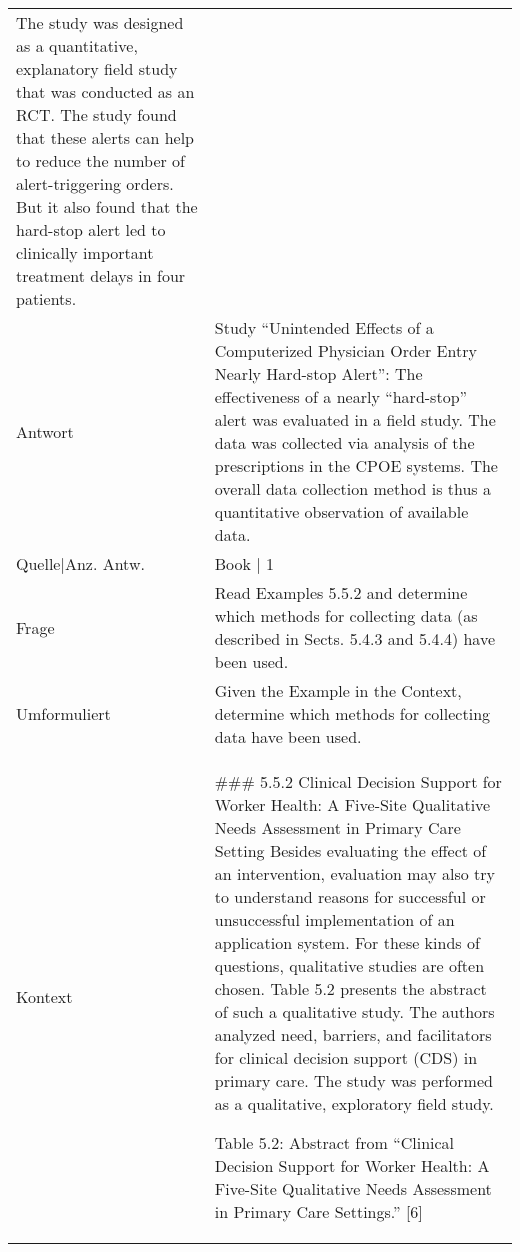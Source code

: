 {\begin{landscape}
\begin{longtable}{p{3cm}p{}}
    The study was designed as a quantitative, explanatory field study that was conducted as an RCT.
    The study found that these alerts can help to reduce the number of alert-triggering orders.
    But it also found that the hard-stop alert led to clinically important treatment delays in four patients.\\
    Antwort & Study ``Unintended Effects of a Computerized Physician Order Entry Nearly Hard-stop Alert'': The effectiveness of a nearly ``hard-stop'' alert was evaluated in a field study.
    The data was collected via analysis of the prescriptions in the CPOE systems.
    The overall data collection method is thus a quantitative observation of available data.\\
    Quelle|Anz. Antw. &  Book  | 1 \\
    \midrule
    Frage & Read Examples 5.5.2 and determine which methods for collecting data (as described in Sects. 5.4.3 and 5.4.4) have been used.\\
    Umformuliert & Given the Example in the Context, determine which methods for collecting data have been used.\\
    Kontext & \#\#\# 5.5.2 Clinical Decision Support for Worker Health: A Five-Site Qualitative Needs Assessment in Primary Care Setting
    Besides evaluating the effect of an intervention, evaluation may also try to understand reasons for successful or unsuccessful implementation of an application system.
    For these kinds of questions, qualitative studies are often chosen.
    Table 5.2 presents the abstract of such a qualitative study.
    The authors analyzed need, barriers, and facilitators for clinical decision support (CDS) in primary care.
    The study was performed as a qualitative, exploratory field study.

    Table 5.2: Abstract from ``Clinical Decision Support for Worker Health: A Five-Site Qualitative Needs Assessment in Primary Care Settings.'' [6]


\end{longtable}
\end{landscape}}
